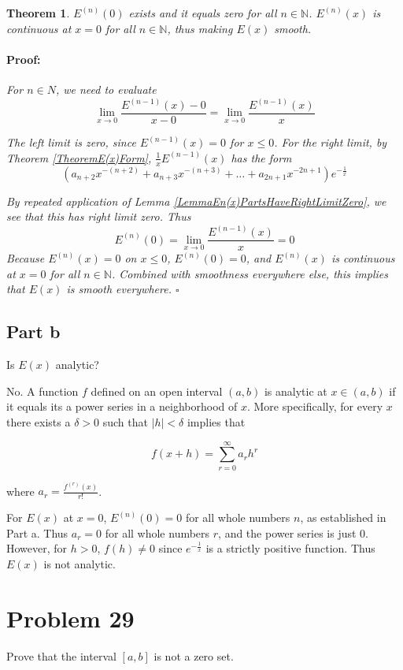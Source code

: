 \documentclass{article}
\newenvironment{proof}{\paragraph{Proof:}}{\hfill$\square$}
\newtheorem{theorem}{Theorem}
\newcommand{\N}{\mathbb{N}}
\begin{document}
\begin{theorem}
$E^{(n)}(0)$ exists and it equals zero for all $n \in \N$. $E^{(n)}(x)$ is continuous at $x=0$ for all $n \in \N$, thus making $E(x)$ smooth.
\begin{proof}
For $n \in N$, we need to evaluate
\[
\lim_{x \rightarrow 0} \frac{E^{(n-1)}(x)-0}{x-0} = 
\lim_{x \rightarrow 0} \frac{E^{(n-1)}(x)}{x}
\]

The left limit is zero, since $E^{(n-1)}(x) = 0$ for $x \leq 0$. For the right limit, by Theorem \ref{TheoremE(x)Form}, $\frac{1}{x}E^{(n-1)}(x)$ has the form
\[
(a_{n+2} x^{-(n+2)} + a_{n+3}x^{-(n+3)} + \dots + a_{2n+1}x^{-2n+1})e^{-\frac{1}{x}}
\]

By repeated application of Lemma \ref{LemmaEn(x)PartsHaveRightLimitZero}, we see that this has right limit zero. Thus
\[
E^{(n)}(0) = \lim_{x \rightarrow 0} \frac{E^{(n-1)}(x)}{x} = 0
\]
Because $E^{(n)}(x) = 0$ on $x \leq 0$, $E^{(n)}(0) = 0$, and $E^{(n)}(x)$ is continuous at $x = 0$ for all $n \in \N$. Combined with smoothness everywhere else, this implies that $E(x)$ is smooth everywhere.
\end{proof}
\end{theorem}

\subsection*{Part b}

Is $E(x)$ analytic?

No. A function $f$ defined on an open interval $(a, b)$ is analytic at $x \in (a, b)$ if it equals its a power series in a neighborhood of $x$. More specifically, for every $x$ there exists a $\delta > 0$ such that $|h| < \delta$ implies that

\[
f(x+h) = \sum_{r=0}^\infty a_r h^r
\]

where $a_r = \frac{f^{(r)}(x)}{r!}$.

For $E(x)$ at $x=0$, $E^{(n)}(0) = 0$ for all whole numbers $n$, as established in Part a. Thus $a_r = 0$ for all whole numbers $r$, and the power series is just $0$. However, for $h > 0$, $f(h) \neq 0$ since $e^{-\frac{1}{x}}$ is a strictly positive function. Thus $E(x)$ is not analytic.

\section*{Problem 29}

Prove that the interval $[a, b]$ is not a zero set.
\end{document}
